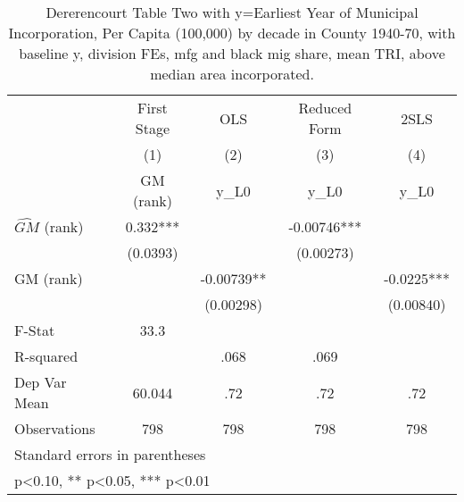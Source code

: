 \begin{table}[htbp]\centering
\def\sym#1{\ifmmode^{#1}\else\(^{#1}\)\fi}
\caption{Dererencourt Table Two with y=Earliest Year of Municipal Incorporation, Per Capita (100,000) by decade in County 1940-70, with baseline y, division FEs, mfg and black mig share, mean TRI, above median area incorporated.}
\begin{tabular}{l*{4}{c}}
\toprule
                    & First Stage   &         OLS   &Reduced Form   &        2SLS   \\
                    &\multicolumn{1}{c}{(1)}&\multicolumn{1}{c}{(2)}&\multicolumn{1}{c}{(3)}&\multicolumn{1}{c}{(4)}\\
                    &\multicolumn{1}{c}{GM  (rank)}&\multicolumn{1}{c}{y\_L0}&\multicolumn{1}{c}{y\_L0}&\multicolumn{1}{c}{y\_L0}\\
\midrule
$\hat{GM}$ (rank)   &       0.332***&               &    -0.00746***&               \\
                    &    (0.0393)   &               &   (0.00273)   &               \\
\addlinespace
GM  (rank)          &               &    -0.00739** &               &     -0.0225***\\
                    &               &   (0.00298)   &               &   (0.00840)   \\
\midrule
F-Stat              &        33.3   &               &               &               \\
R-squared           &               &        .068   &        .069   &               \\
Dep Var Mean        &      60.044   &         .72   &         .72   &         .72   \\
Observations        &         798   &         798   &         798   &         798   \\
\bottomrule
\multicolumn{5}{l}{\footnotesize Standard errors in parentheses}\\
\multicolumn{5}{l}{\footnotesize * p<0.10, ** p<0.05, *** p<0.01}\\
\end{tabular}
\end{table}

